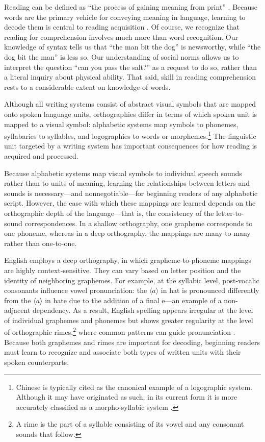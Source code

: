 \documentclass[preprint,12pt, authoryear, review]{elsarticle}
\begin{document}
Reading can be defined as “the process of gaining meaning from print” \citep[][p. 34]{raynerHowPsychologicalScience2001}. Because words are the primary vehicle for conveying meaning in language, learning to decode them is central to reading acquisition \citep[e.g.,][]{castlesEndingReadingWars2018}. Of course, we recognize that reading for comprehension involves much more than word recognition. Our knowledge of syntax tells us that “the man bit the dog” is newsworthy, while “the dog bit the man” is less so. Our understanding of social norms allows us to interpret the question “can you pass the salt?” as a request to do so, rather than a literal inquiry about physical ability. That said, skill in reading comprehension rests to a considerable extent on knowledge of words.

Although all writing systems consist of abstract visual symbols that are mapped onto spoken language units, orthographies differ in terms of which spoken unit is mapped to a visual symbol: alphabetic systems map symbols to phonemes, syllabaries to syllables, and logographies to words or morphemes.\footnote{Chinese is typically cited as the canonical example of a logographic system. Although it may have originated as such, in its current form it is more accurately classified as a morpho-syllabic system \citep{raynerHowPsychologicalScience2001}.} The linguistic unit targeted by a writing system has important consequences for how reading is acquired and processed.

Because alphabetic systems map visual symbols to individual speech sounds rather than to units of meaning, learning the relationships between letters and sounds is necessary---and nonnegotiable---for beginning readers of any alphabetic script. However, the ease with which these mappings are learned depends on the orthographic depth of the language—that is, the consistency of the letter-to-sound correspondences. In a shallow orthography, one grapheme corresponds to one phoneme, whereas in a deep orthography, the mappings are many-to-many rather than one-to-one.

English employs a deep orthography, in which grapheme-to-phoneme mappings are highly context-sensitive. They can vary based on letter position and the identity of neighboring graphemes. For example, at the syllabic level, post-vocalic consonants influence vowel pronunciation: the $\langle a\rangle$ in hat is pronounced differently from the $\langle a\rangle$ in hate due to the addition of a final e—an example of a non-adjacent dependency. As a result, English spelling appears irregular at the level of individual graphemes and phonemes but shows greater regularity at the level of orthographic rimes,\footnote{A rime is the part of a syllable consisting of its vowel and any consonant sounds that follow.} where common patterns can guide pronunciation \citep{treimanSpecialRoleRimes1995}. Because both graphemes and rimes are important for decoding, beginning readers must learn to recognize and associate both types of written units with their spoken counterparts.
\end{document}
